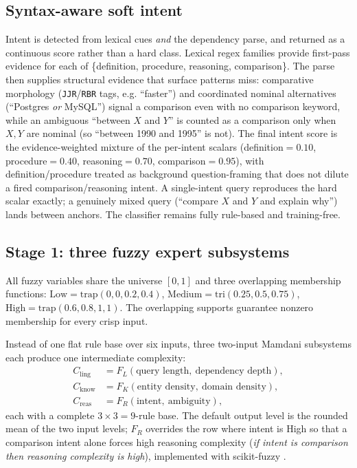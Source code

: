 \documentclass[11pt]{article}
\begin{document}
\subsection{Syntax-aware soft intent}
\label{sec:intent}

Intent is detected from lexical cues \emph{and} the dependency parse, and
returned as a continuous score rather than a hard class. Lexical regex families
provide first-pass evidence for each of \{definition, procedure, reasoning,
comparison\}. The parse then supplies structural evidence that surface patterns
miss: comparative morphology (\texttt{JJR}/\texttt{RBR} tags, e.g. ``faster'')
and coordinated nominal alternatives (``Postgres \emph{or} MySQL'') signal a
comparison even with no comparison keyword, while an ambiguous ``between $X$ and
$Y$'' is counted as a comparison only when $X,Y$ are nominal (so ``between 1990
and 1995'' is not). The final intent score is the evidence-weighted mixture of
the per-intent scalars (definition${=}0.10$, procedure${=}0.40$,
reasoning${=}0.70$, comparison${=}0.95$), with definition/procedure treated as
background question-framing that does not dilute a fired comparison/reasoning
intent. A single-intent query reproduces the hard scalar exactly; a genuinely
mixed query (``compare $X$ and $Y$ and explain why'') lands between anchors. The
classifier remains fully rule-based and training-free.

\subsection{Stage 1: three fuzzy expert subsystems}
\label{sec:subsystems}

All fuzzy variables share the universe $[0,1]$ and three overlapping
membership functions: $\mathrm{Low} = \mathrm{trap}(0,0,0.2,0.4)$,
$\mathrm{Medium} = \mathrm{tri}(0.25,0.5,0.75)$,
$\mathrm{High} = \mathrm{trap}(0.6,0.8,1,1)$. The overlapping supports
guarantee nonzero membership for every crisp input.

Instead of one flat rule base over six inputs, three two-input Mamdani
subsystems \citep{mamdani1975experiment} each produce one intermediate
complexity:
\begin{align*}
C_{\mathrm{ling}} &= F_L(\text{query length},\ \text{dependency depth}),\\
C_{\mathrm{know}} &= F_K(\text{entity density},\ \text{domain density}),\\
C_{\mathrm{reas}} &= F_R(\text{intent},\ \text{ambiguity}),
\end{align*}
each with a complete $3\times3 = 9$-rule base. The default output level is the
rounded mean of the two input levels; $F_R$ overrides the row where intent is
High so that a comparison intent alone forces high reasoning complexity
(\emph{if intent is comparison then reasoning complexity is high}),
implemented with scikit-fuzzy \citep{warner2019skfuzzy}.
\end{document}

